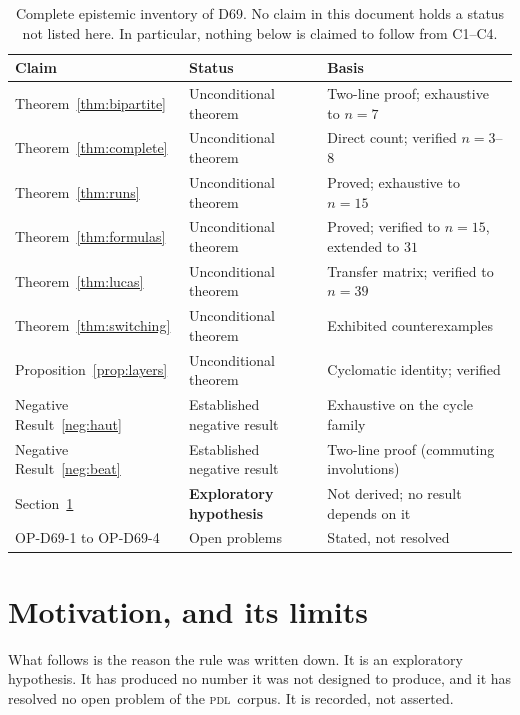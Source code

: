 \documentclass[11pt,a4paper]{article}
\newcommand{\PDL}{\textsc{pdl}}
\begin{document}
\begin{table}[h]
\centering
\small
\begin{tabular}{llp{6.6cm}}
\toprule
\textbf{Claim} & \textbf{Status} & \textbf{Basis} \\
\midrule
Theorem~\ref{thm:bipartite} & Unconditional theorem & Two-line proof; exhaustive to $n=7$ \\
Theorem~\ref{thm:complete} & Unconditional theorem & Direct count; verified $n=3$--$8$ \\
Theorem~\ref{thm:runs} & Unconditional theorem & Proved; exhaustive to $n=15$ \\
Theorem~\ref{thm:formulas} & Unconditional theorem & Proved; verified to $n=15$, extended to $31$ \\
Theorem~\ref{thm:lucas} & Unconditional theorem & Transfer matrix; verified to $n=39$ \\
Theorem~\ref{thm:switching} & Unconditional theorem & Exhibited counterexamples \\
Proposition~\ref{prop:layers} & Unconditional theorem & Cyclomatic identity; verified \\
Negative Result~\ref{neg:haut} & Established negative result & Exhaustive on the cycle family \\
Negative Result~\ref{neg:beat} & Established negative result & Two-line proof (commuting involutions) \\
Section~\ref{sec:motivation} & \textbf{Exploratory hypothesis} & Not derived; no result depends on it \\
OP-D69-1 to OP-D69-4 & Open problems & Stated, not resolved \\
\bottomrule
\end{tabular}
\caption{Complete epistemic inventory of D69. No claim in this document holds a status not listed here. In particular, nothing below is claimed to follow from C1--C4.}
\label{tab:status}
\end{table}

\section{Motivation, and its limits}
\label{sec:motivation}

\begin{hypbox}
What follows is the reason the rule was written down. It is an exploratory hypothesis. It has produced no number it was not designed to produce, and it has resolved no open problem of the \PDL\ corpus. It is recorded, not asserted.
\end{hypbox}
\end{document}
